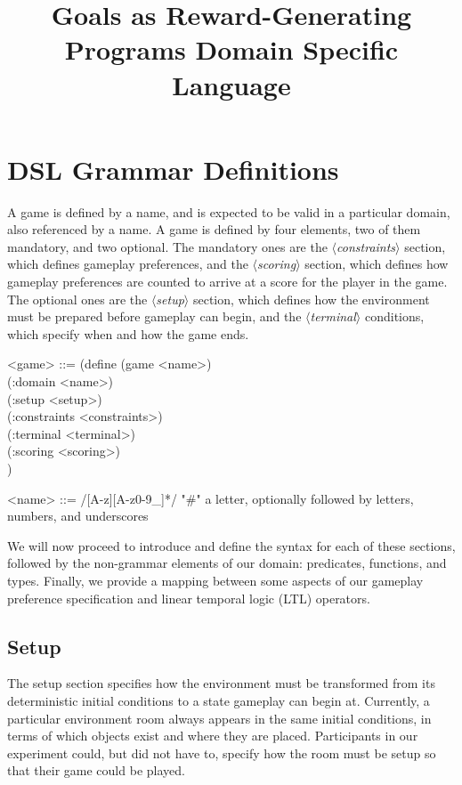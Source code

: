 \documentclass{article}
\title{Goals as Reward-Generating Programs Domain Specific Language}
\newcommand{\dsl}[1]{{\it $\langle$#1$\rangle$}}
\begin{document}
\maketitle

\section{DSL Grammar Definitions}

A game is defined by a name, and is expected to be valid in a particular domain, also referenced by a name. 
A game is defined by four elements, two of them mandatory, and two optional.
The mandatory ones are the \dsl{constraints} section, which defines gameplay preferences, and the \dsl{scoring} section, which defines how gameplay preferences are counted to arrive at a score for the player in the game.
The optional ones are the \dsl{setup} section, which defines how the environment must be prepared before gameplay can begin, and the \dsl{terminal} conditions, which specify when and how the game ends. 

\begin{grammar}
<game> ::= (define (game <name>) \\
  (:domain <name>) \\
  (:setup <setup>) \\
  (:constraints <constraints>) \\
  (:terminal <terminal>) \\
  (:scoring <scoring>) \\)

<name> ::= /[A-z][A-z0-9_]*/ "#" a letter, optionally followed by letters, numbers, and underscores
\end{grammar}

We will now proceed to introduce and define the syntax for each of these sections, followed by the non-grammar elements of our domain: predicates, functions, and types. 
Finally, we provide a mapping between some aspects of our gameplay preference specification and linear temporal logic (LTL) operators. 

\subsection{Setup} \label{sec:setup}
The setup section specifies how the environment must be transformed from its deterministic initial conditions to a state gameplay can begin at. 
Currently, a particular environment room always appears in the same initial conditions, in terms of which objects exist and where they are placed.
Participants in our experiment could, but did not have to, specify how the room must be setup so that their game could be played.
\end{document}
